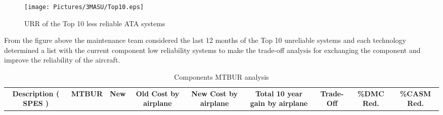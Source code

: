 \begin{figure}[H]
	\centering
	\texttt{[image: Pictures/3MASU/Top10.eps]}
	\caption{URR of the Top 10 less reliable ATA systems}
	\label{fig:Top10Maintenance}
\end{figure}

From the figure above the maintenance team considered the last 12 months of the Top 10 unreliable systems and each technology determined a list with the current component low reliability systems to make the trade-off analysis for exchanging the component and improve the reliability of the aircraft.

\begin{table}[htbp]
  \centering
  \tiny
  \caption{Components MTBUR analysis}
    \begin{tabular}{rcccccccc}
    \toprule
    \multicolumn{1}{c}{\multirow{2}[4]{*}{\textbf{Description ( SPES )}}} & \textbf{MTBUR} & \textbf{New} & \multirow{2}[4]{*}{\textbf{Old Cost by airplane}} & \multirow{2}[4]{*}{\textbf{New Cost by airplane}} & \multirow{2}[4]{*}{\textbf{Total 10 year gain by airplane}} & \multirow{2}[4]{*}{\textbf{Trade-Off}} & \multirow{2}[4]{*}{\textbf{\%DMC Red.}} & \multirow{2}[4]{*}{\textbf{\%CASM Red.}} \\


\end{tabular}
\end{table}
